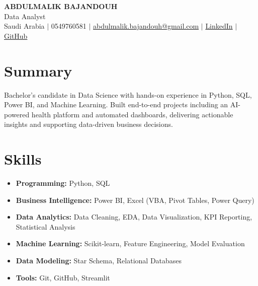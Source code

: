 \documentclass[letterpaper,9.5pt]{article}
\newcommand{\resumeItem}[1]{\item\small{#1}}
\newcommand{\resumeSubHeadingList}{\begin{itemize}[leftmargin=0.15in, label={}, itemsep=-2pt]}
\newcommand{\resumeSubHeadingListEnd}{\end{itemize}}
\begin{document}
\begin{center}
  \textbf{\Huge ABDULMALIK BAJANDOUH} \\ \vspace{1pt}
  \small Data Analyst \\ \vspace{1pt}
  \small Saudi Arabia $|$ 0549760581 $|$
  \href{mailto:abdulmalik.bajandouh@gmail.com}{abdulmalik.bajandouh@gmail.com} $|$
  \href{https://linkedin.com/in/abdulmalik-bajandouh-b337b140a}{LinkedIn} $|$
  \href{https://github.com/ABDULMALIK0001}{GitHub}
\end{center}

\section*{Summary}
Bachelor's candidate in Data Science with hands-on experience in Python, SQL, Power BI, and Machine Learning. Built end-to-end projects including an AI-powered health platform and automated dashboards, delivering actionable insights and supporting data-driven business decisions.

\section{Skills}
\resumeSubHeadingList
  \resumeItem{\textbf{Programming:} Python, SQL}
  \resumeItem{\textbf{Business Intelligence:} Power BI, Excel (VBA, Pivot Tables, Power Query)}
  \resumeItem{\textbf{Data Analytics:} Data Cleaning, EDA, Data Visualization, KPI Reporting, Statistical Analysis}
  \resumeItem{\textbf{Machine Learning:} Scikit-learn, Feature Engineering, Model Evaluation}
  \resumeItem{\textbf{Data Modeling:} Star Schema, Relational Databases}
  \resumeItem{\textbf{Tools:} Git, GitHub, Streamlit}
\resumeSubHeadingListEnd

\end{document}

